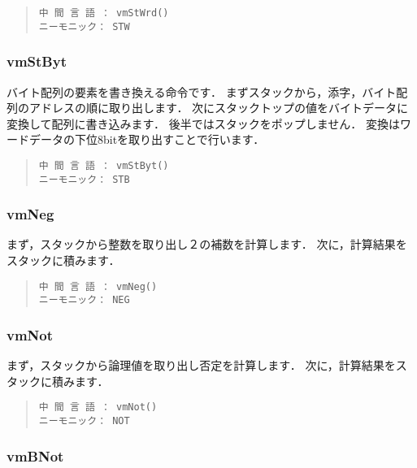 \begin{quote}
\begin{verbatim}
中 間 言 語 ： vmStWrd()
ニーモニック： STW
\end{verbatim}
\end{quote}

\subsubsection{vmStByt}

バイト配列の要素を書き換える命令です．
まずスタックから，添字，バイト配列のアドレスの順に取り出します．
次にスタックトップの値をバイトデータに変換して配列に書き込みます．
後半ではスタックをポップしません．
変換はワードデータの下位8bitを取り出すことで行います．

\begin{quote}
\begin{verbatim}
中 間 言 語 ： vmStByt()
ニーモニック： STB
\end{verbatim}
\end{quote}

\subsubsection{vmNeg}

まず，スタックから整数を取り出し２の補数を計算します．
次に，計算結果をスタックに積みます．

\begin{quote}
\begin{verbatim}
中 間 言 語 ： vmNeg()
ニーモニック： NEG
\end{verbatim}
\end{quote}

\subsubsection{vmNot}

まず，スタックから論理値を取り出し否定を計算します．
次に，計算結果をスタックに積みます．

\begin{quote}
\begin{verbatim}
中 間 言 語 ： vmNot()
ニーモニック： NOT
\end{verbatim}
\end{quote}

\subsubsection{vmBNot}

